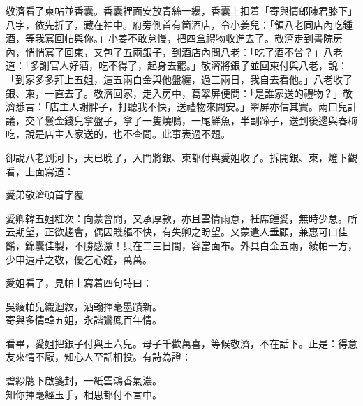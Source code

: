 敬濟看了柬帖並香囊。香囊裡面安放青絲一縷，香囊上扣着「寄與情郎陳君膝下」八字，{}依先折了，藏在袖中。府旁側首有箇酒店，令小姜兒：「領八老同店內吃鍾酒，等我寫回帖與你。」小姜不敢怠慢，把四盒禮物收進去了。敬濟走到書院房內，悄悄寫了回柬，又包了五兩銀子，到酒店內問八老：「吃了酒不曾？」八老道：「多謝官人好酒，吃不得了，起身去罷。」敬濟將銀子並回柬付與八老，說：「到家多多拜上五姐，這五兩白金與他盤纏，過三兩日，我自去看他。」八老收了銀、柬，一直去了。敬濟回家，走入房中，葛翠屏便問：「是誰家送的禮物？」敬濟悉言：「店主人謝胖子，打聽我不快，送禮物來問安。」翠屏亦信其實。兩口兒計議，交丫鬟金錢兒拿盤子，拿了一隻燒鴨，一尾鮮魚，半副蹄子，送到後邊與春梅吃，說是店主人家送的，也不查問。此事表過不題。

卻說八老到河下，天已晚了，入門將銀、柬都付與愛姐收了。拆開銀、柬，燈下觀看，上面寫道：

\begin{myquote}[\markfont]
愛弟敬濟頓首字覆

愛卿韓五姐粧次：向蒙會問，又承厚款，亦且雲情雨意，衽席鍾愛，無時少怠。所云期望，正欲趨會，偶因賤軀不快，有失卿之盼望。又蒙遣人垂顧，兼惠可口佳餚，錦囊佳製，不勝感激！只在二三日間，容當面布。外具白金五兩，綾帕一方，少申遠芹之敬，優乞心鑑，萬萬。

\end{myquote}

愛姐看了，見帕上寫着四句詩曰：

\begin{myquote}
吳綾帕兒織迴紋，洒翰揮毫墨蹟新。\\寄與多情韓五姐，永諧鸞鳳百年情。
\end{myquote}

看畢，愛姐把銀子付與王六兒。母子千歡萬喜，等候敬濟，不在話下。正是：得意友來情不厭，知心人至話相投。有詩為證：

\begin{myquote}
碧紗牕下啟箋封，一紙雲鴻香氣濃。\\知你揮毫經玉手，相思都付不言中。
\end{myquote}

